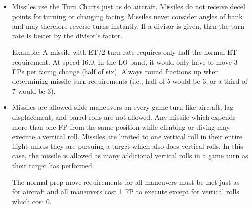 \begin{itemize}
\begin{itemize}
            \item {}

        \end{itemize}

    \item {} Missiles use the Turn Charts just as do aircraft. Missiles do not receive decel points for turning or changing facing. Missiles never consider angles of bank and may therefore reverse turns instantly. If a divisor is given, then the turn rate is better by the divisor's factor.

        Example: A missile with ET/2 turn rate requires only half the normal ET requirement. At speed 16.0, in the LO band, it would only have to move 3 FPs per facing change (half of six). Always round fractions up when determining missile turn requirements (i.e., half of 5 would be 3, or a third of 7 would be 3).

    \item {} Missiles are allowed slide maneuvers on every game turn like aircraft, lag displacement, and barrel rolls are not allowed. Any missile which expends more than one FP from the same position while climbing or diving may execute a vertical roll. Missiles are limited to one vertical roll in their entire flight unless they are pursuing a target which also does vertical rolls. In this case, the missile is allowed as many additional vertical rolls in a game turn as their target has performed.

        The normal prep-move requirements for all maneuvers must be met just as for aircraft and all maneuvers cost 1 FP to execute except for vertical rolls which cost 0. 

\end{itemize}

